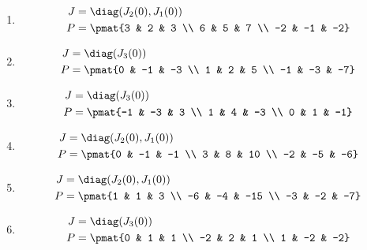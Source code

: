 \begin{enumerate}
\item

\begin{align*}
J &= \diag(J_{2}(0), J_{1}(0))\\
P &= \pmat{3 & 2 & 3 \\ 6 & 5 & 7 \\ -2 & -1 & -2}
\end{align*}

\item

\begin{align*}
J &= \diag(J_{3}(0))\\
P &= \pmat{0 & -1 & -3 \\ 1 & 2 & 5 \\ -1 & -3 & -7}
\end{align*}

\item

\begin{align*}
J &= \diag(J_{3}(0))\\
P &= \pmat{-1 & -3 & 3 \\ 1 & 4 & -3 \\ 0 & 1 & -1}
\end{align*}

\item

\begin{align*}
J &= \diag(J_{2}(0), J_{1}(0))\\
P &= \pmat{0 & -1 & -1 \\ 3 & 8 & 10 \\ -2 & -5 & -6}
\end{align*}

\item

\begin{align*}
J &= \diag(J_{2}(0), J_{1}(0))\\
P &= \pmat{1 & 1 & 3 \\ -6 & -4 & -15 \\ -3 & -2 & -7}
\end{align*}

\item

\begin{align*}
J &= \diag(J_{3}(0))\\
P &= \pmat{0 & 1 & 1 \\ -2 & 2 & 1 \\ 1 & -2 & -2}
\end{align*}


\end{enumerate}
